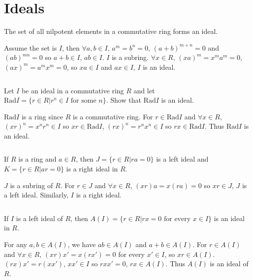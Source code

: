 \section{Ideals}
\begin{ex}
    The set of all nilpotent elements in a commutative ring forms an ideal.
\end{ex}

\begin{answer}
    Assume the set is $I$, then $\forall a,b\in I$, $a^{m}=b^{n}=0$, $(a+b)^{m+n}=0$ and $(ab)^{mn}=0$ so $a+b\in I$, $ab\in I$. $I$ is a subring. $\forall x\in R$, $(xa)^{m}=x^{m}a^{m}=0$, $(ax)^{m}=a^{m}x^{m}=0$, so $xa\in I$ and $ax\in I$, $I$ is an ideal.
\end{answer}

$$ $$

\begin{ex}
    Let $I$ be an ideal in a commutative ring $R$ and let $\mathrm{Rad} I=\{r\in R| r^{n}\in I \text{ for some } n\}$. Show that $\mathrm{Rad}I$ is an ideal.
\end{ex}

\begin{answer}
    $\mathrm{Rad} I$ is a ring since $R$ is a commutative ring. For $r\in \mathrm{Rad} I$ and $\forall x\in R$, $(xr)^{n}=x^{n}r^{n}\in I$ so $xr\in \mathrm{Rad} I$, $(rx)^{n}=r^{n}x^{n}\in I$ so $rx\in \mathrm{Rad} I$. Thus $\mathrm{Rad} I$ is an ideal.
\end{answer}

$$ $$

\begin{ex}
    If $R$ is a ring and $a\in R$, then $J=\{r\in R|ra=0\}$ is a left ideal and $K=\{r\in R|ar=0\}$ is a right ideal in $R$.
\end{ex}

\begin{answer}
    $J$ is a subring of $R$. For $r\in J$ and $\forall x\in R$, $(xr)a=x(ra)=0$ so $xr\in J$, $J$ is a left ideal. Similarly, $I$ is a right ideal.
\end{answer}

$$ $$

\begin{ex}
    If $I$ is a left ideal of $R$, then $A(I)=\{r\in R|rx=0 \text{ for every }x\in I\}$ is an ideal in $R$.
\end{ex}

\begin{answer}
    For any $a,b\in A(I)$, we have $ab\in A(I)$ and $a+b\in A(I)$. For $r\in A(I)$ and $\forall x\in R$, $(xr)x'=x(rx')=0$ for every $x'\in I$, so $xr\in A(I)$. $(rx)x'=r(xx')$, $x x'\in I$ so $rx x'=0$, $rx\in A(I)$. Thus $A(I)$ is an ideal of $R$.
\end{answer}

